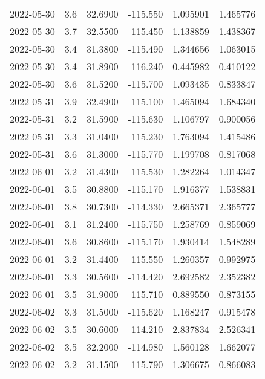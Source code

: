 \begin{tabular}{lrrrrr}
2022-05-30 &       3.6 &  32.6900 &  -115.550 &         1.095901 &         1.465776 \\
2022-05-30 &       3.7 &  32.5500 &  -115.450 &         1.138859 &         1.438367 \\
2022-05-30 &       3.4 &  31.3800 &  -115.490 &         1.344656 &         1.063015 \\
2022-05-30 &       3.4 &  31.8900 &  -116.240 &         0.445982 &         0.410122 \\
2022-05-30 &       3.6 &  31.5200 &  -115.700 &         1.093435 &         0.833847 \\
2022-05-31 &       3.9 &  32.4900 &  -115.100 &         1.465094 &         1.684340 \\
2022-05-31 &       3.2 &  31.5900 &  -115.630 &         1.106797 &         0.900056 \\
2022-05-31 &       3.3 &  31.0400 &  -115.230 &         1.763094 &         1.415486 \\
2022-05-31 &       3.6 &  31.3000 &  -115.770 &         1.199708 &         0.817068 \\
2022-06-01 &       3.2 &  31.4300 &  -115.530 &         1.282264 &         1.014347 \\
2022-06-01 &       3.5 &  30.8800 &  -115.170 &         1.916377 &         1.538831 \\
2022-06-01 &       3.8 &  30.7300 &  -114.330 &         2.665371 &         2.365777 \\
2022-06-01 &       3.1 &  31.2400 &  -115.750 &         1.258769 &         0.859069 \\
2022-06-01 &       3.6 &  30.8600 &  -115.170 &         1.930414 &         1.548289 \\
2022-06-01 &       3.2 &  31.4400 &  -115.550 &         1.260357 &         0.992975 \\
2022-06-01 &       3.3 &  30.5600 &  -114.420 &         2.692582 &         2.352382 \\
2022-06-01 &       3.5 &  31.9000 &  -115.710 &         0.889550 &         0.873155 \\
2022-06-02 &       3.3 &  31.5000 &  -115.620 &         1.168247 &         0.915478 \\
2022-06-02 &       3.5 &  30.6000 &  -114.210 &         2.837834 &         2.526341 \\
2022-06-02 &       3.5 &  32.2000 &  -114.980 &         1.560128 &         1.662077 \\
2022-06-02 &       3.2 &  31.1500 &  -115.790 &         1.306675 &         0.866083 \\

\end{tabular}
